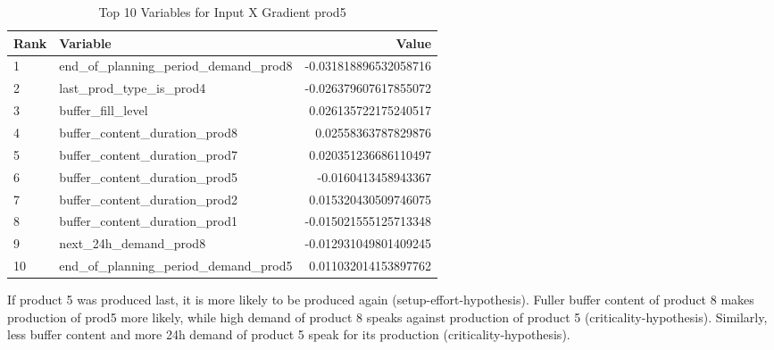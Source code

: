 \begin{table}[ht!]
    \footnotesize
    \centering
    \caption{Top 10 Variables for Input X Gradient prod5}
    \label{tab:top_variables_prod5}
    \begin{tabularx}{\textwidth}{lXr}
        \toprule
        \textbf{Rank} & \textbf{Variable}                        & \textbf{Value}        \\
        \midrule
        1             & end\_of\_planning\_period\_demand\_prod8 & -0.031818896532058716 \\
        2             & last\_prod\_type\_is\_prod4              & -0.026379607617855072 \\
        3             & buffer\_fill\_level                      & 0.026135722175240517  \\
        4             & buffer\_content\_duration\_prod8         & 0.02558363787829876   \\
        5             & buffer\_content\_duration\_prod7         & 0.020351236686110497  \\
        6             & buffer\_content\_duration\_prod5         & -0.0160413458943367   \\
        7             & buffer\_content\_duration\_prod2         & 0.015320430509746075  \\
        8             & buffer\_content\_duration\_prod1         & -0.015021555125713348 \\
        9             & next\_24h\_demand\_prod8                 & -0.012931049801409245 \\
        10            & end\_of\_planning\_period\_demand\_prod5 & 0.011032014153897762  \\
        \bottomrule
    \end{tabularx}
\end{table}
\FloatBarrier


If product 5 was produced last, it is more likely to be produced again (setup-effort-hypothesis).
Fuller buffer content of product 8 makes production of prod5 more likely, while high demand of product 8 speaks against production of product 5 (criticality-hypothesis).
Similarly, less buffer content and more 24h demand of product 5 speak for its production (criticality-hypothesis).

